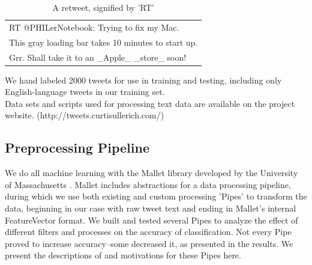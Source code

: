 \documentclass[letterpaper]{article}
\begin{document}
\begin{table}[h]
\centering
\begin{tabular}{|l|}
	\hline
	RT @PHILerNotebook: Trying to fix my Mac. \\ This gray loading bar takes 10 minutes to start up. \\ Grr. Shall take it to an \_Apple\_ \_store\_ soon! \\
	\hline
\end{tabular}
\caption{A retweet, signified by 'RT'}
\end{table}

We hand labeled 2000 tweets for use in training and testing, including only English-language tweets in our training set. \\
Data sets and scripts used for processing text data are available on the project website. (http://tweets.curtisullerich.com/)\\

\subsection{Preprocessing Pipeline}

We do all machine learning with the Mallet library developed by the University of Massachusetts \cite{McCallumMALLET}. Mallet includes abstractions for a data processing pipeline, during which we use both existing and custom processing 'Pipes' to transform the data, beginning in our case with raw tweet text and ending in Mallet's internal FeatureVector format. We built and tested several Pipes to analyze the effect of different filters and processes on the accuracy of classification. Not every Pipe proved to increase accuracy--some decreased it, as presented in the results. We present the descriptions of and motivations for these Pipes here.
\end{document}
